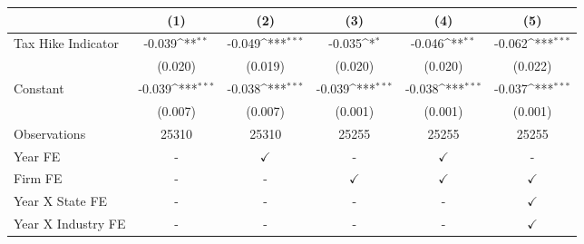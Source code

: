 {
\def\sym#1{\ifmmode^{#1}\else\(^{#1}\)\fi}
\begin{tabular}{l*{5}{c}}
\toprule
                    &\multicolumn{1}{c}{(1)}         &\multicolumn{1}{c}{(2)}         &\multicolumn{1}{c}{(3)}         &\multicolumn{1}{c}{(4)}         &\multicolumn{1}{c}{(5)}         \\
\midrule
Tax Hike Indicator  &      -0.039\sym{**} &      -0.049\sym{***}&      -0.035\sym{*}  &      -0.046\sym{**} &      -0.062\sym{***}\\
                    &     (0.020)         &     (0.019)         &     (0.020)         &     (0.020)         &     (0.022)         \\
Constant            &      -0.039\sym{***}&      -0.038\sym{***}&      -0.039\sym{***}&      -0.038\sym{***}&      -0.037\sym{***}\\
                    &     (0.007)         &     (0.007)         &     (0.001)         &     (0.001)         &     (0.001)         \\
\midrule
Observations        &       25310         &       25310         &       25255         &       25255         &       25255         \\
Year FE             &           -         &$\checkmark$         &           -         &$\checkmark$         &           -         \\
Firm FE             &           -         &           -         &$\checkmark$         &$\checkmark$         &$\checkmark$         \\
Year X State FE     &           -         &           -         &           -         &           -         &$\checkmark$         \\
Year X Industry FE  &           -         &           -         &           -         &           -         &$\checkmark$         \\
\bottomrule
\end{tabular}
}
